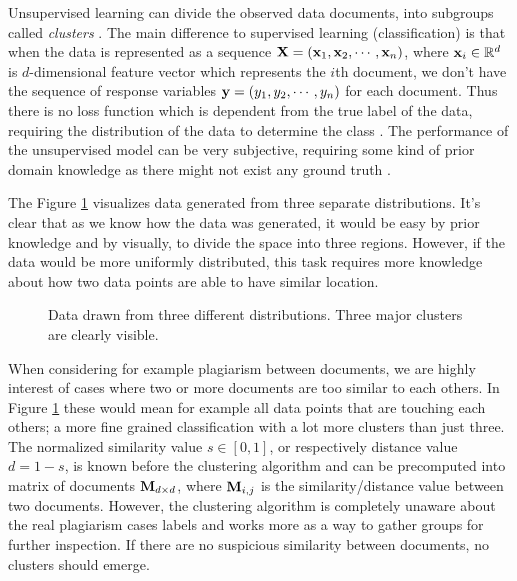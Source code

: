 Unsupervised learning can divide the observed data \ie documents, into subgroups called \emph{clusters} \cite{hastie_09_elements-of.statistical-learning}. The main difference to supervised learning (classification) is that when the data is represented as a sequence $\mathbf{X} = (\mathbf{x}_1, \mathbf{x}_2, \cdots, \mathbf{x}_n)$, where $\mathbf{x}_i \in \mathbb{R}^d$ is $d$-dimensional feature vector which represents the $i$th document, we don't have the sequence of response variables $\mathbf{y} = (y_1, y_2, \cdots, y_n)$ for each document. Thus there is no loss function which is dependent from the true label of the data, requiring the distribution of the data to determine the class \cite{Manning:2008:IIR:1394399}. The performance of the unsupervised model can be very subjective, requiring some kind of prior domain knowledge as there might not exist any ground truth \cite{hastie_09_elements-of.statistical-learning}. 

The Figure \ref{fig-clust-example} visualizes data generated from three separate distributions. It's clear that as we know how the data was generated, it would be easy by prior knowledge and by visually, to divide the space into three regions. However, if the data would be more uniformly distributed, this task requires more knowledge about how two data points are able to have similar location.

\begin{figure}[!h]
\centering
\setlength\figureheight{8cm}
\setlength\figurewidth{8cm}

\caption{Data drawn from three different distributions. Three major clusters are clearly visible.} \label{fig-clust-example}
\end{figure}

When considering for example plagiarism between documents, we are highly interest of cases where two or more documents are too similar to each others. In Figure \ref{fig-clust-example} these would mean for example all data points that are touching each others; a more fine grained classification with a lot more clusters than just three. The normalized similarity value $s \in [0, 1]$, or respectively distance value $d = 1 - s$, is known before the clustering algorithm and can be precomputed into matrix of documents $\mathbf{M}_{d \times d}$, where $\mathbf{M}_{i, j}$ is the similarity/distance value between two documents. However, the clustering algorithm is completely unaware about the real plagiarism cases \ie labels and works more as a way to gather groups for further inspection. If there are no suspicious similarity between documents, no clusters should emerge.

